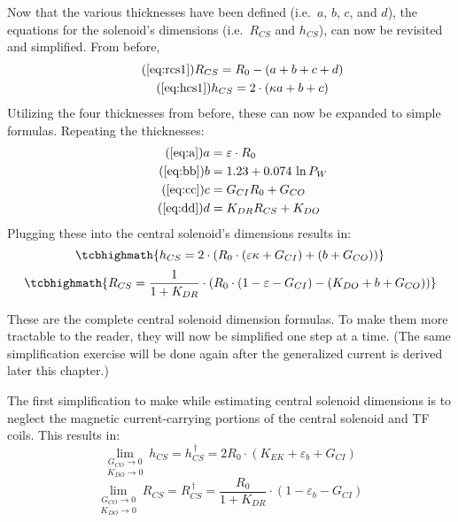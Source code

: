 Now that the various thicknesses have been defined (i.e.\ $a$, $b$, $c$, and $d$), the equations for the solenoid's dimensions (i.e.\ $R_{CS}$ and $h_{CS}$), can now be revisited and simplified. From before,
 \begin{gather}
 	\tag{\ref{eq:rcs1}}
 	R_{CS} = R_0 - ( a + b + c + d ) \\
	\tag{\ref{eq:hcs1}}
 	h_{CS} = 2 \cdot \left ( \kappa a + b + c \right)
 \end{gather}
Utilizing the four thicknesses from before, these can now be expanded to simple formulas. Repeating the thicknesses:
\begin{align}
	\tag{\ref{eq:a}}
	a &= \varepsilon \cdot R_0 \\
	\tag{\ref{eq:bb}}
	b &= 1.23 + 0.074 \ \textnormal{ln} \, P_W \\
	\tag{\ref{eq:cc}}
	c &= G_{CI} R_0 + G_{CO} \\
 	\tag{\ref{eq:dd}}
	d &= K_{DR} R_{CS} + K_{DO}
\end{align}
Plugging these into the central solenoid's dimensions results in:
\begin{equation}
	\tcbhighmath{
	h_{CS} = 2 \cdot \left( R_0 \cdot \left( \varepsilon \kappa + G_{CI} \right) + \left( b + G_{CO} \right) \right)
	}
\end{equation}
\begin{equation}
	\tcbhighmath{
	R_{CS} = \frac{ 1 }{ 1 + K_{DR} } \cdot \left( R_0 \cdot \left( 1 - \varepsilon - G_{CI}  \right) - \left( K_{DO} + b + G_{CO}  \right) \right)
	}
\end{equation}

These are the complete central solenoid dimension formulas. To make them more tractable to the reader, they will now be simplified one step at a time. (The same simplification exercise will be done again after the generalized current is derived later this chapter.)

The first simplification to make while estimating central solenoid dimensions is to neglect the magnetic current-carrying portions of the central solenoid and TF coils. This results in:
\begin{equation}
	\underset{K_{DO} \to 0}{\underset{G_{CO} \to 0}{\lim}} \ h_{CS} = h_{CS}^{\,\dagger} = 2 R_0 \cdot \left( K_{EK} + \varepsilon_b + G_{CI} \right)
\end{equation}
\begin{equation}
	\underset{K_{DO} \to 0}{\underset{G_{CO} \to 0}{\lim}} \ R_{CS} = R_{CS}^{\,\dagger} = \frac{ R_0 }{ 1 + K_{DR} } \cdot \left( 1 - \varepsilon_b - G_{CI}  \right)
\end{equation}

